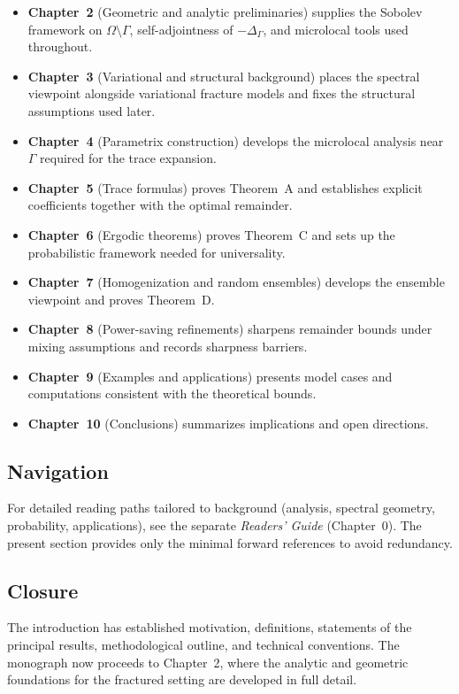 \begin{itemize}
  \item \textbf{Chapter~2} (Geometric and analytic preliminaries) supplies the
  Sobolev framework on $\Omega\setminus\Gamma$, self-adjointness of
  $-\Delta_\Gamma$, and microlocal tools used throughout.
  \item \textbf{Chapter~3} (Variational and structural background) places the
  spectral viewpoint alongside variational fracture models and fixes the
  structural assumptions used later.
  \item \textbf{Chapter~4} (Parametrix construction) develops the microlocal
  analysis near $\Gamma$ required for the trace expansion.
  \item \textbf{Chapter~5} (Trace formulas) proves Theorem~A and establishes
  explicit coefficients together with the optimal remainder.
  \item \textbf{Chapter~6} (Ergodic theorems) proves Theorem~C and sets up the
  probabilistic framework needed for universality.
  \item \textbf{Chapter~7} (Homogenization and random ensembles) develops the
  ensemble viewpoint and proves Theorem~D.
  \item \textbf{Chapter~8} (Power-saving refinements) sharpens remainder bounds
  under mixing assumptions and records sharpness barriers.
  \item \textbf{Chapter~9} (Examples and applications) presents model cases and
  computations consistent with the theoretical bounds.
  \item \textbf{Chapter~10} (Conclusions) summarizes implications and open
  directions.
\end{itemize}

\subsection{Navigation}

For detailed reading paths tailored to background (analysis, spectral geometry,
probability, applications), see the separate \emph{Readers’ Guide}
(Chapter~0). The present section provides only the minimal forward references
to avoid redundancy.

\subsection{Closure}

The introduction has established motivation, definitions, statements of the
principal results, methodological outline, and technical conventions. The
monograph now proceeds to Chapter~2, where the analytic and geometric
foundations for the fractured setting are developed in full detail.

